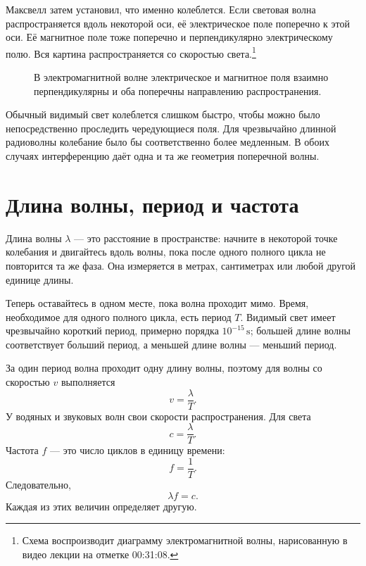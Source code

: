 Максвелл затем установил, что именно колеблется. Если световая волна распространяется вдоль некоторой оси, её электрическое поле поперечно к этой оси. Её магнитное поле тоже поперечно и перпендикулярно электрическому полю. Вся картина распространяется со скоростью света.\footnote{Схема воспроизводит диаграмму электромагнитной волны, нарисованную в видео лекции на отметке 00:31:08.}

\begin{figure}[h]
\centering
{}
\caption{В электромагнитной волне электрическое и магнитное поля взаимно перпендикулярны и оба поперечны направлению распространения.}
\end{figure}

Обычный видимый свет колеблется слишком быстро, чтобы можно было непосредственно проследить чередующиеся поля. Для чрезвычайно длинной радиоволны колебание было бы соответственно более медленным. В обоих случаях интерференцию даёт одна и та же геометрия поперечной волны.

\section{Длина волны, период и частота}

Длина волны \(\lambda\) — это расстояние в пространстве: начните в некоторой точке колебания и двигайтесь вдоль волны, пока после одного полного цикла не повторится та же фаза. Она измеряется в метрах, сантиметрах или любой другой единице длины.

Теперь оставайтесь в одном месте, пока волна проходит мимо. Время, необходимое для одного полного цикла, есть период \(T\). Видимый свет имеет чрезвычайно короткий период, примерно порядка \(10^{-15}\,\mathrm{s}\); большей длине волны соответствует больший период, а меньшей длине волны — меньший период.

За один период волна проходит одну длину волны, поэтому для волны со скоростью \(v\) выполняется
\begin{equation}
v=\frac{\lambda}{T}.
\end{equation}
У водяных и звуковых волн свои скорости распространения. Для света
\begin{equation}
c=\frac{\lambda}{T}.
\end{equation}
Частота \(f\) — это число циклов в единицу времени:
\begin{equation}
f=\frac{1}{T}.
\end{equation}
Следовательно,
\begin{equation}
\lambda f=c.
\end{equation}
Каждая из этих величин определяет другую.

